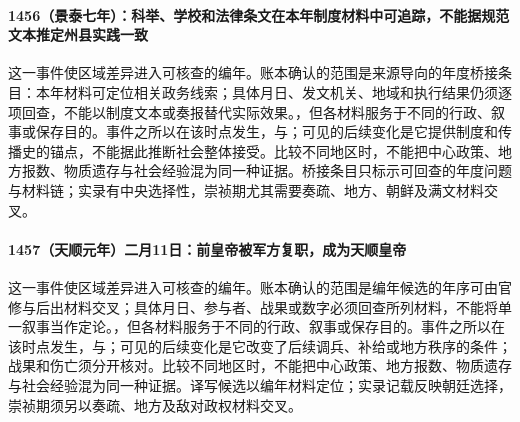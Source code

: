 \paragraph{1456（景泰七年）：科举、学校和法律条文在本年制度材料中可追踪，不能据规范文本推定州县实践一致} 这一事件使区域差异进入可核查的编年。账本确认的范围是来源导向的年度桥接条目：本年材料可定位相关政务线索；具体月日、发文机关、地域和执行结果仍须逐项回查，不能以制度文本或奏报替代实际效果。，但各材料服务于不同的行政、叙事或保存目的。事件之所以在该时点发生，与；可见的后续变化是它提供制度和传播史的锚点，不能据此推断社会整体接受。比较不同地区时，不能把中心政策、地方报数、物质遗存与社会经验混为同一种证据。桥接条目只标示可回查的年度问题与材料链；实录有中央选择性，崇祯期尤其需要奏疏、地方、朝鲜及满文材料交叉。

\paragraph{1457（天顺元年）二月11日：前皇帝被军方复职，成为天顺皇帝} 这一事件使区域差异进入可核查的编年。账本确认的范围是编年候选的年序可由官修与后出材料交叉；具体月日、参与者、战果或数字必须回查所列材料，不能将单一叙事当作定论。，但各材料服务于不同的行政、叙事或保存目的。事件之所以在该时点发生，与；可见的后续变化是它改变了后续调兵、补给或地方秩序的条件；战果和伤亡须分开核对。比较不同地区时，不能把中心政策、地方报数、物质遗存与社会经验混为同一种证据。译写候选以编年材料定位；实录记载反映朝廷选择，崇祯期须另以奏疏、地方及敌对政权材料交叉。
